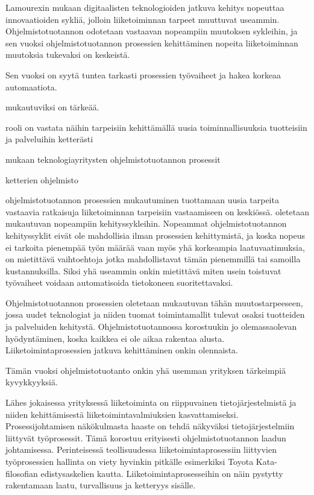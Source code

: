 \documentclass[finnish,12pt,a4paper,pdftex]{article}
\begin{document}
Lamourexin \citeyearpar{lamoureux} mukaan digitaalisten teknologioiden jatkuva kehitys nopeuttaa innovaatioiden sykliä, jolloin liiketoiminnan tarpeet muuttuvat useammin. Ohjelmistotuotannon odotetaan vastaavan nopeampiin muutoksen sykleihin, ja sen vuoksi ohjelmistotuotannon prosessien kehittäminen nopeita liiketoiminnan muutoksia tukevaksi on keskeistä. 

Sen vuoksi on syytä tuntea tarkasti prosessien työvaiheet ja hakea korkeaa automaatiota.

mukautuviksi on tärkeää.

rooli on vastata näihin tarpeisiin kehittämällä uusia toiminnallisuuksia tuotteisiin ja palveluihin ketterästi

\cite{leanit, devops} mukaan teknologiayritysten ohjelmistotuotannon prosessit 

ketterien ohjelmisto

ohjelmistotuotannon prosessien mukautuminen tuottamaan uusia tarpeita vastaavia ratkaisuja liiketoiminnan tarpeisiin vastaamiseen on keskiössä.
oletetaan mukautuvan nopeampiin kehityssykleihin. 
Nopeammat ohjelmistotuotannon kehityssyklit eivät ole mahdollisia ilman prosessien kehittymistä, ja koska nopeus ei tarkoita pienempää työn määrää vaan myös yhä korkeampia laatuvaatimuksia, on mietittävä vaihtoehtoja jotka mahdollistavat tämän pienemmillä tai samoilla kustannuksilla. Siksi yhä useammin onkin mietittävä miten usein toistuvat työvaiheet voidaan automatisoida tietokoneen suoritettavaksi. 

Ohjelmistotuotannon prosessien oletetaan mukautuvan tähän muutostarpeeseen, jossa uudet teknologiat ja niiden tuomat toimintamallit tulevat osaksi tuotteiden ja palveluiden kehitystä. Ohjelmistotuotannossa korostuukin jo olemassaolevan hyödyntäminen, koska kaikkea ei ole aikaa rakentaa alusta. 
Liiketoimintaprosessien jatkuva kehittäminen onkin olennaista. 

Tämän vuoksi ohjelmistotuotanto onkin yhä usemman yrityksen tärkeimpiä kyvykkyyksiä. 




Lähes jokaisessa yrityksessä liiketoiminta on riippuvainen tietojärjestelmistä ja niiden kehittämisestä liiketoimintavalmiuksien kasvattamiseksi. Prosessijohtamisen näkökulmasta haaste on tehdä näkyväksi tietojärjestelmiin liittyvät työprosessit. Tämä korostuu erityisesti ohjelmistotuotannon laadun johtamisessa. Perinteisessä teollisuudessa liiketoimintaprosessiin liittyvien työprosessien hallinta on viety hyvinkin pitkälle esimerkiksi Toyota Kata-filosofian edistysaskelien kautta. Liiketoimintaprosesseihin on näin pystytty rakentamaan laatu, turvallisuus ja ketteryys sisälle. 
\end{document}

